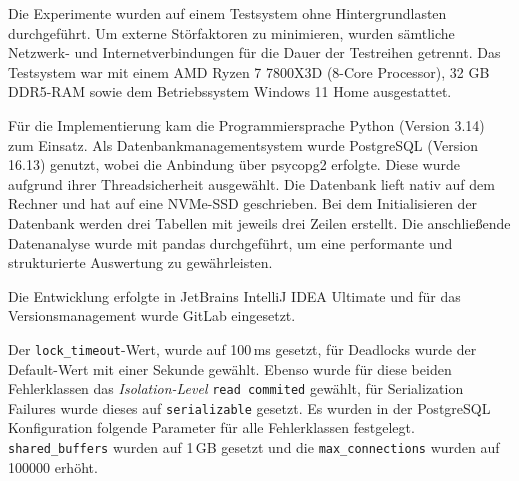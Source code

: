 
Die Experimente wurden auf einem Testsystem ohne Hintergrundlasten durchgeführt.
Um externe Störfaktoren zu minimieren, wurden sämtliche Netzwerk- und Internetverbindungen für die Dauer der
Testreihen getrennt.
Das Testsystem war mit einem AMD Ryzen 7 7800X3D (8-Core Processor), 32 GB DDR5-RAM sowie dem Betriebssystem
Windows 11 Home ausgestattet.

Für die Implementierung kam die Programmiersprache Python (Version 3.14) zum Einsatz.
Als Datenbankmanagementsystem wurde PostgreSQL (Version 16.13) genutzt, wobei die Anbindung über psycopg2 erfolgte.
Diese wurde aufgrund ihrer Threadsicherheit ausgewählt.
Die Datenbank lieft nativ auf dem Rechner und hat auf eine NVMe-SSD geschrieben.
Bei dem Initialisieren der Datenbank werden drei Tabellen mit jeweils drei Zeilen erstellt.
Die anschließende Datenanalyse wurde mit pandas durchgeführt, um eine performante und strukturierte Auswertung zu
gewährleisten.

Die Entwicklung erfolgte in JetBrains IntelliJ IDEA Ultimate und für das Versionsmanagement wurde GitLab eingesetzt.

Der \texttt{lock\_timeout}-Wert, wurde auf 100\,ms gesetzt, für Deadlocks wurde der Default-Wert mit einer Sekunde
gewählt.
Ebenso wurde für diese beiden Fehlerklassen das \emph{Isolation-Level} \texttt{read commited} gewählt,
für Serialization Failures wurde dieses auf \texttt{serializable} gesetzt.
Es wurden in der PostgreSQL Konfiguration folgende Parameter für alle Fehlerklassen festgelegt.
\texttt{shared\_buffers} wurden auf 1\,GB gesetzt und die \texttt{max\_connections} wurden auf 100000 erhöht.